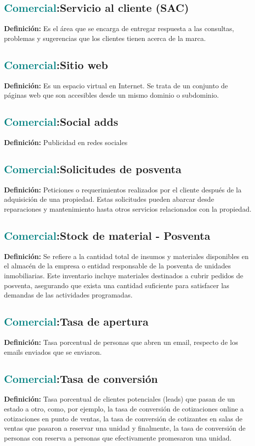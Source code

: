 \documentclass[12pt]{article}
\begin{document}
\subsection{\textcolor{teal}{Comercial}:{Servicio al cliente (SAC)}}
\textbf{Definición:} Es el área que se encarga de entregar respuesta a las consultas, problemas y sugerencias que los clientes tienen acerca de la marca.
\subsection{\textcolor{teal}{Comercial}:{Sitio web}}
\textbf{Definición:} Es un espacio virtual en Internet. Se trata de un conjunto de páginas web que son accesibles desde un mismo dominio o subdominio.
\subsection{\textcolor{teal}{Comercial}:{Social adds}}
\textbf{Definición:} Publicidad en redes sociales
\subsection{\textcolor{teal}{Comercial}:{Solicitudes de posventa}}
\textbf{Definición:} Peticiones o requerimientos realizados por el cliente después de la adquisición de una propiedad. Estas solicitudes pueden abarcar desde reparaciones y mantenimiento hasta otros servicios relacionados con la propiedad.
\subsection{\textcolor{teal}{Comercial}:{Stock de material - Posventa}}
\textbf{Definición:} Se refiere a la cantidad total de insumos y materiales disponibles en el almacén de la empresa o entidad responsable de la posventa de unidades inmobiliarias. Este inventario incluye materiales destinados a cubrir pedidos de posventa, asegurando que exista una cantidad suficiente para satisfacer las demandas de las actividades programadas.
\subsection{\textcolor{teal}{Comercial}:{Tasa de apertura}}
\textbf{Definición:} Tasa porcentual de personas que abren un email, respecto de los emails enviados que se enviaron.
\subsection{\textcolor{teal}{Comercial}:{Tasa de conversión}}
\textbf{Definición:} Tasa porcentual de clientes potenciales (leads) que pasan de un estado a otro, como, por ejemplo, la tasa de conversión de cotizaciones online a cotizaciones en punto de ventas, la tasa de conversión de cotizantes en salas de ventas que pasaron a reservar una unidad y finalmente, la tasa de conversión de personas con reserva a personas que efectivamente promesaron una unidad.
\end{document}
